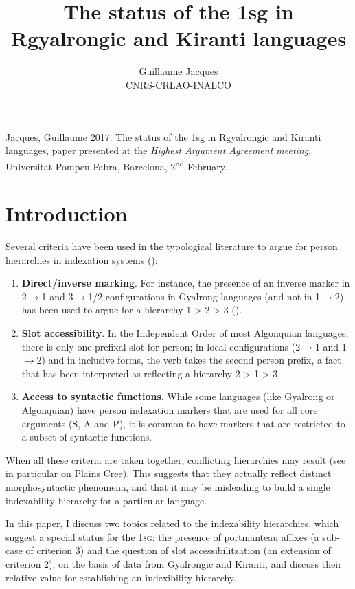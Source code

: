 \documentclass{article}
\begin{document}
 
\title{The status of the 1sg in Rgyalrongic and Kiranti
languages}
\author{Guillaume Jacques\\ CNRS-CRLAO-INALCO}
\maketitle


Jacques, Guillaume 2017. The status of the 1sg in Rgyalrongic and Kiranti
languages, paper presented at the \textit{Highest Argument Agreement meeting}, Universitat Pompeu Fabra, Barcelona, 2\textsuperscript{nd} February.
\sloppy
\section*{Introduction}
Several criteria have been used in the typological literature to argue for person hierarchies in indexation systems (\citealt[27]{zuniga06}):

\begin{enumerate}
\item \textbf{Direct/inverse marking}. For instance, the presence of an inverse marker in 2$\rightarrow$1 and 3$\rightarrow$1/2 configurations in Gyalrong languages (and not in 1$\rightarrow$2) has been used to argue for a hierarchy 1 > 2 > 3 (\citealt{delancey81direction, jackson02rentongdengdi}).
\item \textbf{Slot accessibility}. In the Independent Order of most Algonquian languages, there is only one prefixal slot for person; in local configurations (2$\rightarrow$1 and 1$\rightarrow$2) and in inclusive forms, the verb takes the second person prefix, a fact that has been interpreted as reflecting a hierarchy 2 > 1 > 3.
\item \textbf{Access to syntactic functions}. While some languages (like Gyalrong or Algonquian) have person indexation markers that are used for all core arguments (S, A and P), it is common to have markers that are restricted to a subset of syntactic functions.
\end{enumerate}
When all these criteria are taken together, conflicting hierarchies may result (see in particular \citealt[85-6]{zuniga06} on Plains Cree). This suggests that they actually reflect distinct morphosyntactic phenomena, and that it may be misleading to build a single indexability hierarchy for a particular language.

In this paper, I discuss two topics related to the indexability hierarchies, which suggest a special status for the \textsc{1sg}: the presence of portmanteau affixes (a sub-case of criterion 3) and the question of slot accessibilitzation (an extension of criterion 2), on the basis of data from Gyalrongic and Kiranti, and discuss their relative value for establishing an indexibility hierarchy.
\end{document}
